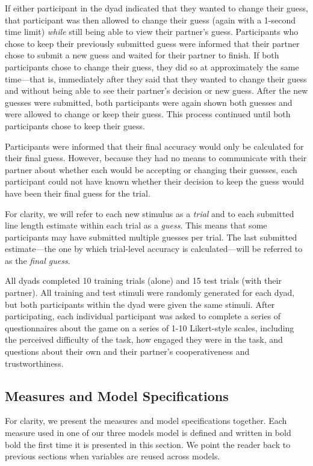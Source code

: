 \documentclass[10pt, letterpaper]{article}
\begin{document}
If either participant in the dyad indicated that they wanted to change
their guess, that participant was then allowed to change their guess
(again with a 1-second time limit) \emph{while} still being able to view
their partner's guess. Participants who chose to keep their previously
submitted guess were informed that their partner chose to submit a new
guess and waited for their partner to finish. If both participants chose
to change their guess, they did so at approximately the same time---that
is, immediately after they said that they wanted to change their guess
and without being able to see their partner's decision or new guess.
After the new guesses were submitted, both participants were again shown
both guesses and were allowed to change or keep their guess. This
process continued until both participants chose to keep their guess.

Participants were informed that their final accuracy would only be
calculated for their final guess. However, because they had no means to
communicate with their partner about whether each would be accepting or
changing their guesses, each participant could not have known whether
their decision to keep the guess would have been their final guess for
the trial.

For clarity, we will refer to each new stimulus as a \emph{trial} and to
each submitted line length estimate within each trial as a \emph{guess}.
This means that some participants may have submitted multiple guesses
per trial. The last submitted estimate---the one by which trial-level
accuracy is calculated---will be referred to as the \emph{final guess}.

All dyads completed 10 training trials (alone) and 15 test trials (with
their partner). All training and test stimuli were randomly generated
for each dyad, but both participants within the dyad were given the same
stimuli. After participating, each individual participant was asked to
complete a series of questionnaires about the game on a series of 1-10
Likert-style scales, including the perceived difficulty of the task, how
engaged they were in the task, and questions about their own and their
partner's cooperativeness and trustworthiness.

\subsection{Measures and Model
Specifications}\label{measures-and-model-specifications}

For clarity, we present the measures and model specifications together.
Each measure used in one of our three models model is defined and
written in bold bold the first time it is presented in this section. We
point the reader back to previous sections when variables are reused
across models.
\end{document}
